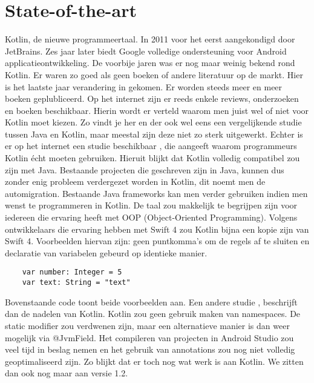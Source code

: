 	\section{State-of-the-art}
	\label{sec:state-of-the-art}
	Kotlin, de nieuwe programmeertaal. In 2011 voor het eerst aangekondigd door JetBrains. Zes jaar later biedt Google volledige ondersteuning voor Android applicatieontwikkeling. De voorbije jaren was er nog maar weinig bekend rond Kotlin. Er waren zo goed als geen boeken of andere literatuur op de markt. Hier is het laatste jaar verandering in gekomen. Er worden steeds meer en meer boeken geplubliceerd. 
	\newline
	\newline
	Op het internet zijn er reeds enkele reviews, onderzoeken en boeken beschikbaar. Hierin wordt er verteld waarom men juist wel of niet voor Kotlin moet kiezen. Zo vindt je her en der ook wel eens een vergelijkende studie tussen Java en Kotlin, maar meestal zijn deze niet zo sterk uitgewerkt.
	\newline
	\newline
	Echter is er op het internet een studie beschikbaar \autocite{Pros}, die aangeeft waarom programmeurs Kotlin écht moeten gebruiken. Hieruit blijkt dat Kotlin volledig compatibel zou zijn met Java. Bestaande projecten die geschreven zijn in Java, kunnen dus zonder enig probleem verdergezet worden in Kotlin, dit noemt men de automigration. Bestaande Java frameworks kan men verder gebruiken indien men wenst te programmeren in Kotlin. De taal zou makkelijk te begrijpen zijn voor iedereen die ervaring heeft met OOP (Object-Oriented Programming). Volgens ontwikkelaars die ervaring hebben met Swift 4 zou Kotlin bijna een kopie zijn van Swift 4. Voorbeelden hiervan zijn: geen puntkomma's om de regels af te sluiten en declaratie van variabelen gebeurd op identieke manier.
	\begin{lstlisting}
	var number: Integer = 5
	var text: String = "text"
	\end{lstlisting}
	Bovenstaande code toont beide voorbeelden aan.
	\newline
	\newline
	Een andere studie \autocite{Cons}, beschrijft dan de nadelen van Kotlin. Kotlin zou geen gebruik maken van namespaces. De static modifier zou verdwenen zijn, maar een alternatieve manier is dan weer mogelijk via @JvmField. Het compileren van projecten in Android Studio zou veel tijd in beslag nemen en het gebruik van annotations zou nog niet volledig geoptimaliseerd zijn. Zo blijkt dat er toch nog wat werk is aan Kotlin. We zitten dan ook nog maar aan versie 1.2. 
